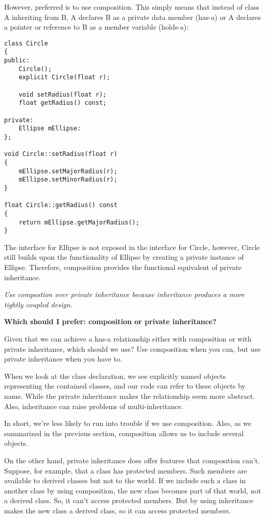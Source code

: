 \documentclass{book}
\begin{document}
However, preferred is to use composition. 
This simply means that instead of class A inheriting from B, A declares B as a private data member (has-a) or A declares a pointer or reference to B as a member variable (holds-a):

\begin{lstlisting}
class Circle
{
public:
	Circle();
	explicit Circle(float r);

	void setRadius(float r);
	float getRadius() const;

private:
	Ellipse mEllipse:
};

void Circle::setRadius(float r)
{
	mEllipse.setMajorRadius(r);
	mEllipse.setMinorRadius(r);
}

float Circle::getRadius() const
{
	return mEllipse.getMajorRadius();
}
\end{lstlisting}

The interface for Ellipse is not exposed in the interface for Circle, however, Circle still builds upon the functionality of Ellipse by creating a private instance of Ellipse.
Therefore, composition provides the functional equivalent of private inheritance.

\textit{Use compostion over private inheritance because inheritance produces a more tightly coupled design.}

\textbf{Which should I prefer: composition or private inheritance?}

Given that we can achieve a has-a relationship either with composition or with private inheritance, which should we use? Use composition when you can, but use private inheritance when you have to.

When we look at the class declaration, we see explicitly named objects representing the contained classes, and our code can refer to these objects by name.
While the private inheritance makes the relationship seem more abstract. Also, inheritance can raise problems of multi-inheritance.

In short, we're less likely to run into trouble if we use composition. Also, as we summarized in the previous section, composition allows us to include several objects.

On the other hand, private inheritance does offer features that composition can't. Suppose, for example, that a class has protected members.
Such members are available to derived classes but not to the world.
If we include such a class in another class by using composition, the new class becomes part of that world, not a derived class.
So, it can't access protected members. But by using inheritance makes the new class a derived class, so it can access protected members.
\end{document}
